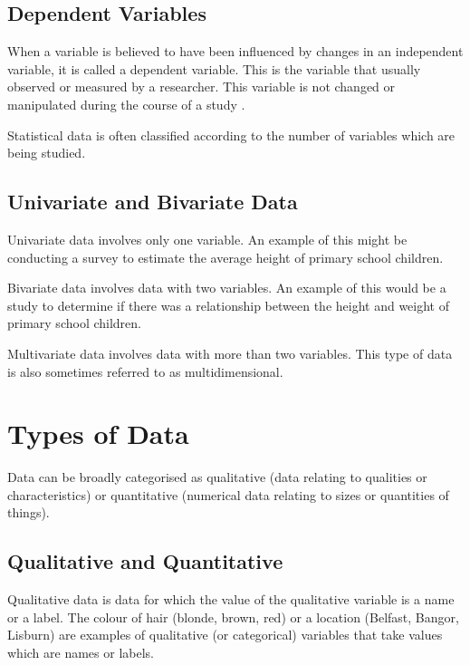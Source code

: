 \documentclass[
]{book}
\begin{document}
\hypertarget{dependent-variables}{%
\subsection{Dependent Variables}\label{dependent-variables}}

When a variable is believed to have been influenced by changes in an independent variable, it is called a dependent variable. This is the variable that usually observed or measured by a researcher. This variable is not changed or manipulated during the course of a study \citep{Witte2017}.

Statistical data is often classified according to the number of variables which are being studied.

\hypertarget{univariate-and-bivariate-data}{%
\subsection{Univariate and Bivariate Data}\label{univariate-and-bivariate-data}}

Univariate data involves only one variable. An example of this might be conducting a survey to estimate the average height of primary school children.

Bivariate data involves data with two variables. An example of this would be a study to determine if there was a relationship between the height and weight of primary school children.

Multivariate data involves data with more than two variables. This type of data is also sometimes referred to as multidimensional.

\hypertarget{types-of-data}{%
\section{Types of Data}\label{types-of-data}}

Data can be broadly categorised as qualitative (data relating to qualities or characteristics) or quantitative (numerical data relating to sizes or quantities of things).

\hypertarget{qualitative-and-quantitative}{%
\subsection{Qualitative and Quantitative}\label{qualitative-and-quantitative}}

Qualitative data is data for which the value of the qualitative variable is a name or a label. The colour of hair (blonde, brown, red) or a location (Belfast, Bangor, Lisburn) are examples of qualitative (or categorical) variables that take values which are names or labels.
\end{document}
